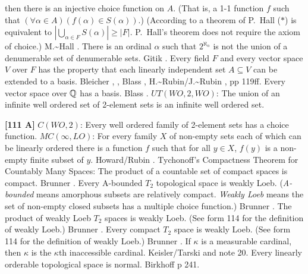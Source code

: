 then there is an injective choice function on $A$. (That is, a 1-1
function $f$ such that $(\forall\alpha\in A)(f(\alpha)\in S(\alpha))$.)
(According to a theorem of P.~Hall ($*$) is equivalent to $\left
|\bigcup_{\alpha\in F} S(\alpha)\right|\ge |F|$. P.~Hall's theorem
does not require the axiom of choice.)  \ac{M.~Hall} \cite{1948}.
\medskip
{}  There is an ordinal $\alpha$ such that $2^{\aleph
_{\alpha}}$ is not the union of a denumerable set of denumerable sets.
\ac{Gitik} \cite{1985}.
\medskip
{} Every field $F$ and every vector space
$V$ over $F$ has the property that each linearly independent set
$A\subseteq V$ can be extended to a basis. \ac{Bleicher} \cite{1964},
\cite{1965}, \ac{Blass} \cite{1984a}, \ac{H.~Rubin/J.~Rubin} \cite{1985},
pp 119ff.
\medskip
{} Every vector space over $\Bbb Q$ has a basis.
\ac{Blass} \cite{1984a}.
\medskip
{} $UT(WO,2,WO)$: The union of an infinite
well ordered set of 2-element sets is an infinite well ordered set.
\smallskip
\item{}{\bf [111 A]} $C(WO,2)$: Every well ordered family of 2-element
sets has a choice function.
\medskip
{} $MC(\infty,LO)$: For every family $X$ of non-empty
sets each of which can be linearly ordered there is a function $f$ such
that for all $y\in X$, $f(y)$ is a non-empty finite subset of $y$.
\ac{Howard/Rubin} \cite{1977}.
\medskip
{} Tychonoff's Compactness Theorem for Countably Many
Spaces: The product of a countable set of compact spaces is compact.
\ac{Brunner} \cite{1985a}. 
\medskip
{} Every A-bounded $T_2$ topological space is weakly
Loeb. ({\it A-bounded} means amorphous subsets are relatively compact.
{\it Weakly Loeb} means the set of non-empty closed subsets
has a multiple choice function.) \ac{Brunner} \cite{1985a}.
\medskip
{} The product of weakly Loeb $T_2$ spaces is weakly
Loeb. (See form 114 for the definition of weakly Loeb.) \ac{Brunner}
\cite{1985a}.
\medskip
{}  Every compact $T_2$ space is weakly  Loeb. (See
form 114 for the definition of weakly Loeb.)  \ac{Brunner} \cite{1985a}.
\medskip
{}  If $\kappa$ is a measurable cardinal,
then $\kappa$ is the $\kappa$th inaccessible cardinal. \ac{Keisler/Tarski}
\cite{1964} and note 20.
\medskip
{}  Every linearly orderable topological space is
normal.  \ac{Birkhoff} \cite{1967} p 241.
